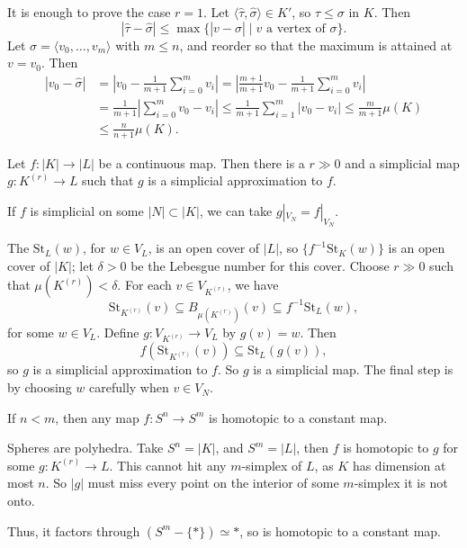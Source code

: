 \documentclass[12pt]{article}
\begin{document}
\begin{proofbox}
	It is enough to prove the case $r = 1$. Let $\langle \hat \tau, \hat \sigma \rangle \in K'$, so $\tau \leq \sigma$ in $K$. Then
	\[
		|\hat \tau - \hat \sigma| \leq \max\{ |v - \hat \sigma| \mid v \text{ a vertex of } \sigma\}.
	\]
	Let $\sigma = \langle v_0, \ldots, v_m \rangle$ with $m \leq n$, and reorder so that the maximum is attained at $v = v_0$. Then
	\begin{align*}
		|v_0 - \hat \sigma| &= \left| v_0 - \frac{1}{m+1} \sum_{i = 0}^m v_i \right| = \left| \frac{m+1}{m+1} v_0 - \frac{1}{m+1} \sum_{i = 0}^m v_i \right| \\
				    &= \frac{1}{m+1} \left| \sum_{i = 0}^m v_0 - v_i \right| \leq \frac{1}{m+1} \sum_{i = 1}^m |v_0 - v_i| \leq \frac{m}{m+1} \mu(K) \\
				    &\leq \frac{n}{n+1} \mu(K).
	\end{align*}
\end{proofbox}

\begin{theorem}
	Let $f : |K| \to |L|$ be a continuous map. Then there is a $r \gg 0$ and a simplicial map $g : K^{(r)} \to L$ such that $g$ is a simplicial approximation to $f$.

	If $f$ is simplicial on some $|N| \subset |K|$, we can take $g|_{V_N} = f|_{V_N}$.
\end{theorem}

\begin{proofbox}
	The $\mathrm{St}_L(w)$, for $w \in V_L$, is an open cover of $|L|$, so $\{f^{-1} \mathrm{St}_K(w)\}$ is an open cover of $|K|$; let $\delta > 0$ be the Lebesgue number for this cover. Choose $r \gg 0$ such that $\mu(K^{(r)}) < \delta$. For each $v \in V_{K^{(r)}}$, we have
	\[
	\mathrm{St}_{K^{(r)}}(v) \subseteq B_{\mu(K^{(r)})}(v) \subseteq f^{-1} \mathrm{St}_L(w),
\]
	for some $w \in V_L$. Define $g : V_{K^{(r)}} \to V_L$ by $g(v) = w$. Then
	\[
	f(\mathrm{St}_{K^{(r)}}(v)) \subseteq \mathrm{St}_L(g(v)),
	\]
	so $g$ is a simplicial approximation to $f$. So $g$ is a simplicial map. The final step is by choosing $w$ carefully when $v \in V_N$.
\end{proofbox}

\begin{corollary}
	If $n < m$, then any map $f : S^n \to S^m$ is homotopic to a constant map.
\end{corollary}

\begin{proofbox}
	Spheres are polyhedra. Take $S^n = |K|$, and $S^m = |L|$, then $f$ is homotopic to $g$ for some $g : K^{(r)} \to L$. This cannot hit any $m$-simplex of $L$, as $K$ has dimension at most $n$. So $|g|$ must miss every point on the interior of some $m$-simplex it is not onto.

	Thus, it factors through $(S^{m} - \{\ast\}) \simeq \ast$, so is homotopic to a constant map.
\end{proofbox}
\end{document}
